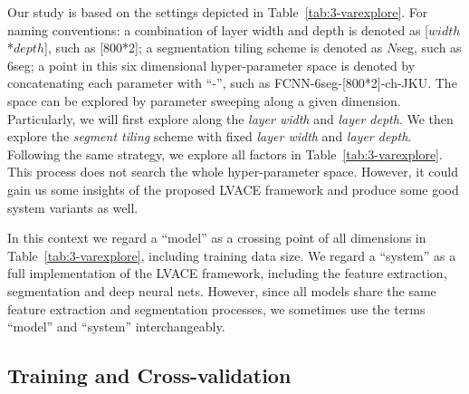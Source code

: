 Our study is based on the settings depicted in Table~\ref{tab:3-varexplore}. For naming conventions: a combination of layer width and depth is denoted as [$width$*$depth$], such as [800*2]; a segmentation tiling scheme is denoted as $N$seg, such as 6seg; a point in this six dimensional hyper-parameter space is denoted by concatenating each parameter with ``-'', such as FCNN-6seg-[800*2]-ch-JKU. The space can be explored by parameter sweeping along a given dimension. Particularly, we will first explore along the {\it layer width} and {\it layer depth}. We then explore the \textit{segment tiling} scheme with fixed {\it layer width} and {\it layer depth}. Following the same strategy, we explore all factors in Table~\ref{tab:3-varexplore}. This process does not search the whole hyper-parameter space. However, it could gain us some insights of the proposed LVACE framework and produce some good system variants as well.

In this context we regard a ``model'' as a crossing point of all dimensions in Table~\ref{tab:3-varexplore}, including training data size. We regard a ``system'' as a full implementation of the LVACE framework, including the feature extraction, segmentation and deep neural nets. However, since all models share the same feature extraction and segmentation processes, we sometimes use the terms ``model'' and ``system'' interchangeably.


\subsection{Training and Cross-validation}\label{sec:3-traintest}

